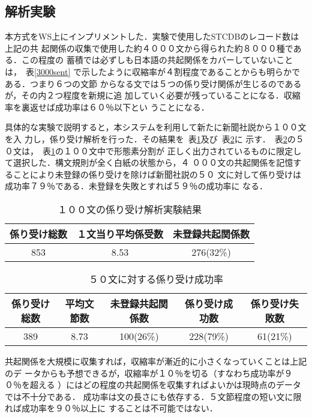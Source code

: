 \subsection{解析実験}

本方式をWS上にインプリメントした．実験で使用したSTCDBのレコード数は上記の共
起関係の収集で使用した約４０００文から得られた約８０００種である．この程度の
蓄積では必ずしも日本語の共起関係をカバーしていないことは，~表\ref{3000sent}
で示したように収縮率が４割程度であることからも明らかである．つまり６つの文節
からなる文では５つの係り受け関係が生じるのであるが，その内２つ程度を新規に追
加していく必要が残っていることになる．収縮率を裏返せば成功率は６０％以下とい
うことになる．

具体的な実験で説明すると，本システムを利用して新たに新聞社説から１００文を入
力し，係り受け解析を行った．その結果を~表\ref{100sent}及び~表\ref{50sent}に
示す．~表\ref{50sent}の５０文は，~表\ref{100sent}の１００文中で形態素分割が
正しく出力されているものに限定して選択した．構文規則が全く白紙の状態から，４
０００文の共起関係を記憶することにより未登録の係り受けを除けば新聞社説の５０
文に対して係り受けは成功率７９％である．未登録を失敗とすれば５９％の成功率に
なる．
\begin{table}[htb] \caption{１００文の係り受け解析実験結果} \label{100sent}
\begin{center}
\begin{tabular}{|c|c|c|} \hline   
係り受け総数&１文当り平均係受数&未登録共起関係数\\ \hline
853&8.53&276(32\%)\\ \hline
\end{tabular}
\end{center}
\end{table}


\begin{table}[htb] \caption{５０文に対する係り受け成功率} \label{50sent}
\begin{center}
\begin{tabular}{|c|c|c||c|c|} \hline   
係り受け総数&平均文節数&未登録共起関係数&係り受け成功数&係り受け失敗数\\ \hline
389&8.73&100(26\%)&228(79\%)&61(21\%)\\ \hline
\end{tabular}
\end{center}
\end{table}



共起関係を大規模に収集すれば，収縮率が漸近的に小さくなっていくことは上記のデ
ータからも予想できるが，収縮率が１０％を切る（すなわち成功率が９０％を超える
）にはどの程度の共起関係を収集すればよいかは現時点のデータでは不十分である．
成功率は文の長さにも依存する．５文節程度の短い文に限れば成功率を９０％以上に
することは不可能ではない．

